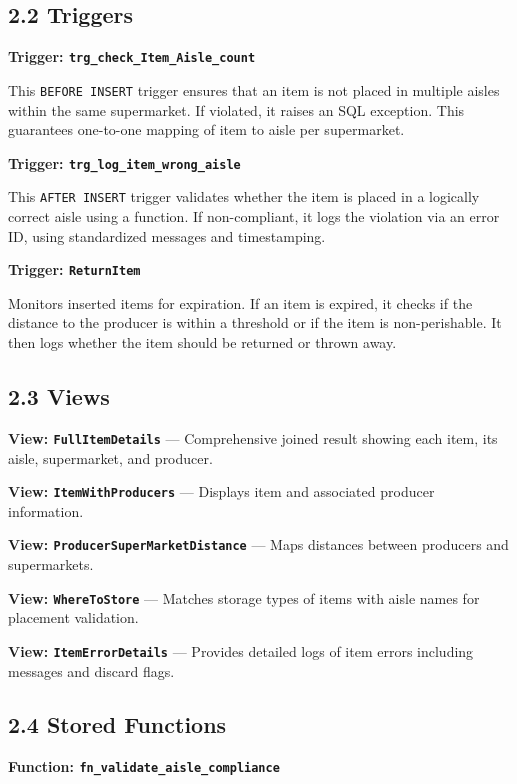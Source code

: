 \documentclass[a4paper,12pt]{article}
\begin{document}
\subsection*{2.2 Triggers}

\textbf{Trigger: \texttt{trg\_check\_Item\_Aisle\_count}}

This \texttt{BEFORE INSERT} trigger ensures that an item is not placed in multiple aisles within the same supermarket. If violated, it raises an SQL exception. This guarantees one-to-one mapping of item to aisle per supermarket.

\textbf{Trigger: \texttt{trg\_log\_item\_wrong\_aisle}}

This \texttt{AFTER INSERT} trigger validates whether the item is placed in a logically correct aisle using a function. If non-compliant, it logs the violation via an error ID, using standardized messages and timestamping.

\textbf{Trigger: \texttt{ReturnItem}}

Monitors inserted items for expiration. If an item is expired, it checks if the distance to the producer is within a threshold or if the item is non-perishable. It then logs whether the item should be returned or thrown away.

\subsection*{2.3 Views}

\textbf{View: \texttt{FullItemDetails}} — Comprehensive joined result showing each item, its aisle, supermarket, and producer.

\textbf{View: \texttt{ItemWithProducers}} — Displays item and associated producer information.

\textbf{View: \texttt{ProducerSuperMarketDistance}} — Maps distances between producers and supermarkets.

\textbf{View: \texttt{WhereToStore}} — Matches storage types of items with aisle names for placement validation.

\textbf{View: \texttt{ItemErrorDetails}} — Provides detailed logs of item errors including messages and discard flags.

\subsection*{2.4 Stored Functions}

\textbf{Function: \texttt{fn\_validate\_aisle\_compliance}}
\end{document}
